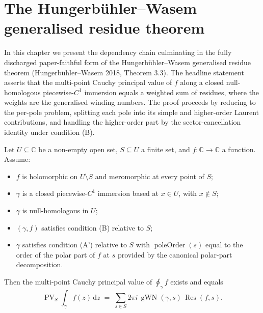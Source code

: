 \section{The Hungerbühler--Wasem generalised residue theorem}\label{sec:hw33}

In this chapter we present the dependency chain culminating in the
fully discharged paper-faithful form of the Hungerbühler--Wasem
generalised residue theorem (Hungerbühler--Wasem 2018, Theorem 3.3).
The headline statement asserts that the multi-point Cauchy principal
value of $f$ along a closed null-homologous piecewise-$C^{1}$
immersion equals a weighted sum of residues, where the weights are
the generalised winding numbers. The proof proceeds by reducing to
the per-pole problem, splitting each pole into its simple and
higher-order Laurent contributions, and handling the higher-order
part by the sector-cancellation identity under condition (B).

\begin{theorem}
  \label{thm:residue-paper-faithful-clean}
  \leanok
  Let $U \subseteq \mathbb{C}$ be a non-empty open set, $S \subseteq U$
  a finite set, and $f : \mathbb{C} \to \mathbb{C}$ a function. Assume:
  \begin{itemize}
    \item $f$ is holomorphic on $U \setminus S$ and meromorphic at
      every point of $S$;
    \item $\gamma$ is a closed piecewise-$C^{1}$ immersion based at
      $x \in U$, with $x \notin S$;
    \item $\gamma$ is null-homologous in $U$;
    \item $(\gamma, f)$ satisfies condition (B) relative to $S$;
    \item $\gamma$ satisfies condition (A') relative to $S$ with
      $\operatorname{poleOrder}(s)$ equal to the order of the polar
      part of $f$ at $s$ provided by the canonical polar-part
      decomposition.
  \end{itemize}
  Then the multi-point Cauchy principal value of $\oint_\gamma f$
  exists and equals
  \[
    \operatorname{PV}_S\!\!\int_\gamma f(z)\,\mathrm{d}z
    \;=\; \sum_{s \in S}
      2 \pi i \, \operatorname{gWN}(\gamma, s) \, \operatorname{Res}(f, s).
  \]
\end{theorem}


